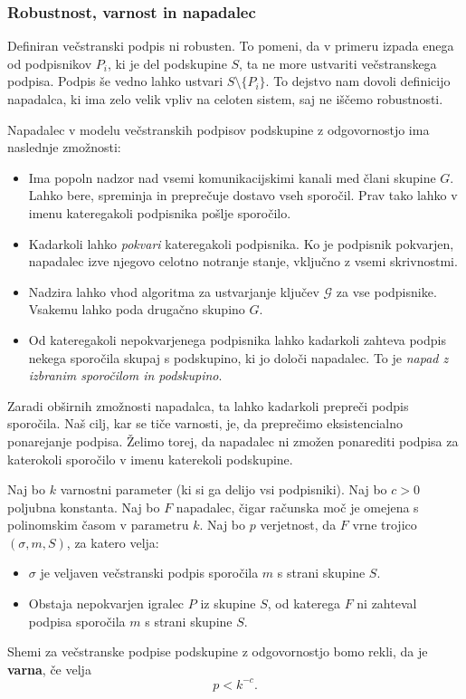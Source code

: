 \documentclass[isrm2, tisk]{fmfdelo}
\begin{document}
\subsubsection{Robustnost, varnost in napadalec}
Definiran večstranski podpis ni robusten. To pomeni, da v primeru izpada enega od podpisnikov $P_i$, 
ki je del podskupine $S$, ta ne more ustvariti večstranskega podpisa. Podpis še vedno lahko ustvari 
$S \setminus \{P_i\}$. To dejstvo nam dovoli definicijo napadalca, ki ima zelo velik vpliv na celoten 
sistem, saj ne iščemo robustnosti. 

\begin{definicija}
\label{def:asm-napadalec}
    Napadalec v modelu večstranskih podpisov podskupine z odgovornostjo ima naslednje zmožnosti:
    \begin{itemize}
        \item Ima popoln nadzor nad vsemi komunikacijskimi kanali med člani skupine $G$. Lahko bere, 
            spreminja in preprečuje dostavo vseh sporočil. Prav tako lahko v imenu kateregakoli 
            podpisnika pošlje sporočilo.
        \item Kadarkoli lahko \textit{pokvari} kateregakoli podpisnika. Ko je podpisnik pokvarjen, 
            napadalec izve njegovo celotno notranje stanje, vključno z vsemi skrivnostmi.
        \item Nadzira lahko vhod algoritma za ustvarjanje ključev $\mathcal{G}$ za vse podpisnike. 
            Vsakemu lahko poda drugačno skupino $G$.
        \item Od kateregakoli nepokvarjenega podpisnika lahko kadarkoli zahteva podpis nekega sporočila 
            skupaj s podskupino, ki jo določi napadalec. To je \textit{napad z izbranim sporočilom 
            in podskupino}.
    \end{itemize}
\end{definicija}

Zaradi obširnih zmožnosti napadalca, ta lahko kadarkoli prepreči podpis sporočila. Naš cilj, kar se 
tiče varnosti, je, da preprečimo eksistencialno ponarejanje podpisa. Želimo torej, da napadalec ni 
zmožen ponarediti podpisa za katerokoli sporočilo v imenu katerekoli podskupine.

\begin{definicija}
\label{def:asm-varnost}
    Naj bo $k$ varnostni parameter (ki si ga delijo vsi podpisniki). Naj bo $c > 0$ poljubna konstanta. 
    Naj bo $F$ napadalec, čigar računska moč je omejena s polinomskim časom v parametru $k$. Naj bo 
    $p$ verjetnost, da  $F$ vrne trojico $(\sigma, m, S)$, za katero velja: 
    \begin{itemize}
        \item $\sigma$ je veljaven večstranski podpis sporočila $m$ s strani skupine $S$.
        \item Obstaja nepokvarjen igralec $P$ iz skupine $S$, od katerega $F$ ni zahteval podpisa 
            sporočila $m$ s strani skupine $S$.
    \end{itemize}
    Shemi za večstranske 
    podpise podskupine z odgovornostjo bomo rekli, da je \textbf{varna}, če velja 
    $$ 
    p < k^{-c}.
    $$
\end{definicija}
\end{document}
